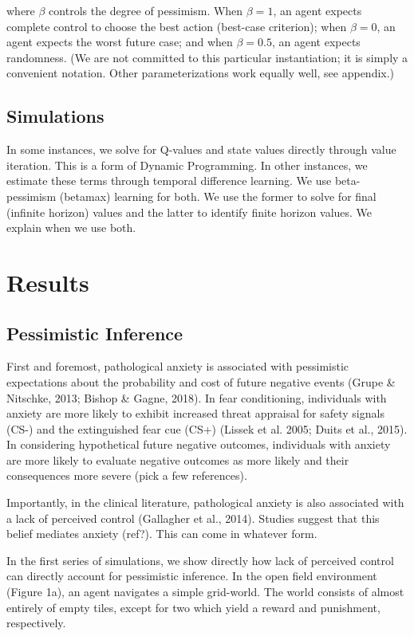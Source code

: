 \documentclass[11pt]{article} %
\begin{document}
where $\beta$ controls the degree of pessimism. When $\beta = 1$, an agent expects
complete control to choose the best action (best-case criterion); when $\beta = 0$,
an agent expects the  worst future case; and when $\beta = 0.5$, an agent expects
randomness. (We are not committed to this particular instantiation; it is simply
a convenient notation. Other parameterizations work equally well, see appendix.)

\subsection{Simulations}

In some instances, we solve for Q-values and state values directly through value
iteration. This is a form of Dynamic Programming. In other instances, we estimate
these terms through temporal difference learning. We use beta-pessimism (betamax)
learning for both. We use the former to solve for final (infinite horizon) values
and the latter to identify finite horizon values. We explain when we use both.

\section{Results}

\subsection{Pessimistic Inference}

First and foremost, pathological anxiety is associated with pessimistic expectations
about the probability and cost of future negative events (Grupe \& Nitschke, 2013;
Bishop \& Gagne, 2018). In fear conditioning, individuals with anxiety are more
likely to exhibit increased threat appraisal for safety signals (CS-) and the
extinguished fear cue (CS+) (Lissek et al. 2005; Duits et al., 2015). In considering
hypothetical future negative outcomes, individuals with anxiety are more likely
to evaluate negative outcomes as more likely and their consequences more severe
(pick a few references).

Importantly, in the clinical literature, pathological anxiety is also associated
with a lack of perceived control (Gallagher et al., 2014). Studies suggest that
this belief mediates anxiety (ref?). This can come in whatever form.

In the first series of simulations, we show directly how lack of perceived control
can directly account for pessimistic inference. In the open field environment
(Figure 1a), an agent navigates a simple grid-world. The world consists of almost
entirely of empty tiles, except for two which yield a reward and punishment,
respectively.
\end{document}
